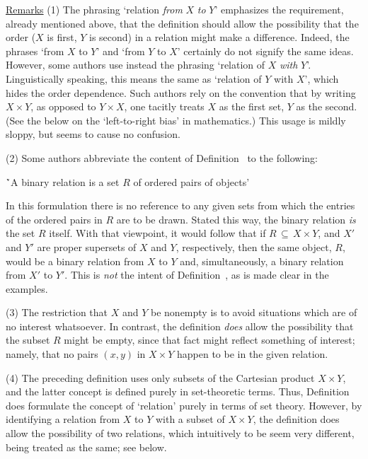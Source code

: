{        \underline{Remarks} (1) The phrasing `relation {\em from} $X$ {\em to} $Y$' emphasizes the requirement, already mentioned above,
    that the definition should allow the possibility that the order ($X$ is first, $Y$ is second) in a relation might make a difference.
    Indeed, the phrases `from $X$ to $Y$' and `from $Y$ to $X$' certainly do not signify the same ideas.
    However, some authors use instead the phrasing `relation of $X$ {\em with} $Y$'.
    Linguistically speaking, this means the same as `relation of $Y$ with $X$', which hides the order dependence.
    Such authors rely on the convention that by writing $X{\times}Y$, as opposed to $Y{\times}X$,
    one tacitly treats $X$ as the first set, $Y$ as the second. (See the {\Note} below on the `left-to-right bias' in mathematics.)
    This usage is mildly sloppy, but seems to cause no confusion.

        (2) Some authors abbreviate the content of Definition~ to the following:

\VA

        \h `A binary relation is a set $R$ of ordered pairs of objects'

\VA

\noindent In this formulation there is no reference to any given sets from which the entries of the ordered pairs in $R$ are to be drawn.
    Stated this way, the binary relation {\em is} the set $R$ itself. With that viewpoint, it would follow that if $R \,{\subseteq}\, X{\times}Y$,
    and $X'$ and $Y'$ are proper supersets of $X$ and $Y$, respectively, then the same object, $R$,
    would be a binary relation from $X$ to $Y$ and, simultaneously, a binary relation from $X'$ to $Y'$.
    This is {\em not} the intent of Definition~, as is made clear in the examples.
    

        (3) The restriction that $X$ and $Y$ be nonempty is to avoid situations which are of no interest whatsoever.
    In contrast, the definition {\em does} allow the possibility that the subset $R$ might be empty, since that fact might reflect something of interest;
    namely, that no pairs $(x,y)$ in $X{\times}Y$ happen to be in the given relation.

        (4) The preceding definition uses only subsets of the Cartesian product $X{\times}Y$, and the latter concept is defined purely in set-theoretic terms.
    Thus, Definition~ does formulate the concept of `relation' purely in terms of set theory.
    However, by identifying a relation from $X$ to $Y$ with a subset of $X{\times}Y$,
    the definition does allow the possibility of two relations, which intuitively to be seem very different, being treated as the same; see below.


}
